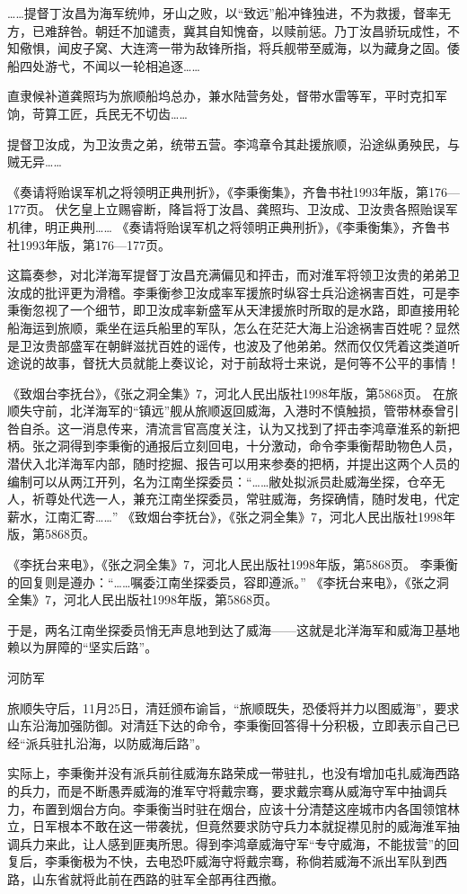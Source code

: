 \documentclass[12pt,UTF8]{ctexbook}
\begin{document}
……提督丁汝昌为海军统帅，牙山之败，以“致远”船冲锋独进，不为救援，督率无方，已难辞咎。朝廷不加谴责，冀其自知愧奋，以赎前惩。乃丁汝昌骄玩成性，不知儆惧，闻皮子窝、大连湾一带为敌锋所指，将兵舰带至威海，以为藏身之固。倭船四处游弋，不闻以一轮相追逐……

直隶候补道龚照玙为旅顺船坞总办，兼水陆营务处，督带水雷等军，平时克扣军饷，苛算工匠，兵民无不切齿……

提督卫汝成，为卫汝贵之弟，统带五营。李鸿章令其赴援旅顺，沿途纵勇殃民，与贼无异……

《奏请将贻误军机之将领明正典刑折》，《李秉衡集》，齐鲁书社1993年版，第176—177页。
伏乞皇上立赐睿断，降旨将丁汝昌、龚照玙、卫汝成、卫汝贵各照贻误军机律，明正典刑…… 《奏请将贻误军机之将领明正典刑折》，《李秉衡集》，齐鲁书社1993年版，第176—177页。

这篇奏参，对北洋海军提督丁汝昌充满偏见和抨击，而对淮军将领卫汝贵的弟弟卫汝成的批评更为滑稽。李秉衡参卫汝成率军援旅时纵容士兵沿途祸害百姓，可是李秉衡忽视了一个细节，即卫汝成率新盛军从天津援旅时所取的是水路，即直接用轮船海运到旅顺，乘坐在运兵船里的军队，怎么在茫茫大海上沿途祸害百姓呢？显然是卫汝贵部盛军在朝鲜滋扰百姓的谣传，也波及了他弟弟。然而仅仅凭着这类道听途说的故事，督抚大员就能上奏议论，对于前敌将士来说，是何等不公平的事情！

《致烟台李抚台》，《张之洞全集》7，河北人民出版社1998年版，第5868页。
在旅顺失守前，北洋海军的“镇远”舰从旅顺返回威海，入港时不慎触损，管带林泰曾引咎自杀。这一消息传来，清流言官高度关注，认为又找到了抨击李鸿章淮系的新把柄。张之洞得到李秉衡的通报后立刻回电，十分激动，命令李秉衡帮助物色人员，潜伏入北洋海军内部，随时挖掘、报告可以用来参奏的把柄，并提出这两个人员的编制可以从两江开列，名为江南坐探委员：“……敝处拟派员赴威海坐探，仓卒无人，祈尊处代选一人，兼充江南坐探委员，常驻威海，务探确情，随时发电，代定薪水，江南汇寄……” 《致烟台李抚台》，《张之洞全集》7，河北人民出版社1998年版，第5868页。

《李抚台来电》，《张之洞全集》7，河北人民出版社1998年版，第5868页。
李秉衡的回复则是遵办：“……嘱委江南坐探委员，容即遵派。” 《李抚台来电》，《张之洞全集》7，河北人民出版社1998年版，第5868页。

于是，两名江南坐探委员悄无声息地到达了威海——这就是北洋海军和威海卫基地赖以为屏障的“坚实后路”。

河防军

旅顺失守后，11月25日，清廷颁布谕旨，“旅顺既失，恐倭将并力以图威海”，要求山东沿海加强防御。对清廷下达的命令，李秉衡回答得十分积极，立即表示自己已经“派兵驻扎沿海，以防威海后路”。

实际上，李秉衡并没有派兵前往威海东路荣成一带驻扎，也没有增加屯扎威海西路的兵力，而是不断愚弄威海的淮军守将戴宗骞，要求戴宗骞从威海守军中抽调兵力，布置到烟台方向。李秉衡当时驻在烟台，应该十分清楚这座城市内各国领馆林立，日军根本不敢在这一带袭扰，但竟然要求防守兵力本就捉襟见肘的威海淮军抽调兵力来此，让人感到匪夷所思。得到李鸿章威海守军“专守威海，不能拔营”的回复后，李秉衡极为不快，去电恐吓威海守将戴宗骞，称倘若威海不派出军队到西路，山东省就将此前在西路的驻军全部再往西撤。
\end{document}
